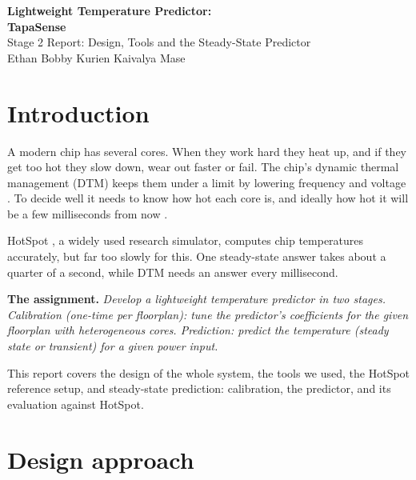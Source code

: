 \documentclass[11pt,a4paper]{article}
\begin{document}
\begin{center}
{\LARGE\bfseries Lightweight Temperature Predictor:}\\[4pt]
{\Large\bfseries TapaSense}\\[8pt]
{\large Stage 2 Report: Design, Tools and the Steady-State Predictor}\\[6pt]
Ethan Bobby Kurien \quad Kaivalya Mase
\end{center}

\tableofcontents

\section{Introduction}\label{sec:intro}
A modern chip has several cores. When they work hard they heat up, and if they get too hot they
slow down, wear out faster or fail. The chip's dynamic thermal management (DTM) keeps them under a
limit by lowering frequency and voltage \cite{skadron03}. To decide well it needs to know how hot
each core is, and ideally how hot it will be a few milliseconds from now
\cite{coskun09}.

HotSpot \cite{hotspot,hotspot6}, a widely used research simulator, computes chip temperatures
accurately, but far too slowly for this. One steady-state answer takes about a quarter of a
second, while DTM needs an answer every millisecond.

\textbf{The assignment.} \emph{Develop a lightweight temperature predictor in two stages.
Calibration (one-time per floorplan): tune the predictor's coefficients for the given floorplan
with heterogeneous cores. Prediction: predict the temperature (steady state or transient) for a
given power input.}

This report covers the design of the whole system, the tools we used, the HotSpot reference
setup, and steady-state prediction: calibration, the predictor, and its evaluation against
HotSpot.

\section{Design approach}
\end{document}
